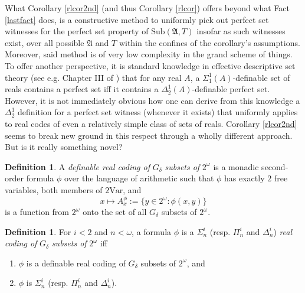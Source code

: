 \documentclass[12pt, twoside]{memoir}
\numberwithin{equation}{section}
\theoremstyle{definition}
\newtheorem{defi}[thm]{Definition}
\theoremstyle{remark}
\theoremstyle{definition}
\theoremstyle{definition}
\theoremstyle{definition}
\theoremstyle{remark}
\begin{document}
What Corollary \ref{rlcor2nd} (and thus Corollary \ref{rlcor}) offers beyond what Fact \ref{lastfact} does, is a constructive method to uniformly pick out perfect set witnesses for the perfect set property of $\mathrm{Sub}(\mathfrak{A}, T)$ insofar as such witnesses exist, over all possible $\mathfrak{A}$ and $T$ within the confines of the corollary's assumptions. Moreover, said method is of very low complexity in the grand scheme of things. To offer another perspective, it is standard knowledge in effective descriptive set theory (see e.g. Chapter III of \cite{sacks}) that for any real $A$, a $\Sigma^1_1(A)$-definable set of reals contains a perfect set iff it contains a $\Delta^1_2(A)$-definable perfect set. However, it is not immediately obvious how one can derive from this knowledge a $\Delta^1_2$ definition for a perfect set witness (whenever it exists) that uniformly applies to real codes of even a relatively simple class of sets of reals. Corollary \ref{rlcor2nd} seems to break new ground in this respect through a wholly different approach. But is it really something novel?

\begin{defi}
A \emph{definable real coding of} $G_{\delta}$ \emph{subsets of} $2^{\omega}$ is a monadic second-order formula $\phi$ over the language of arithmetic such that $\phi$ has exactly $2$ free variables, both members of $\mathrm{2Var}$, and
\begin{equation*}
    x \mapsto A^{\phi}_x := \{y \in 2^{\omega} : \phi(x, y)\}
\end{equation*}
is a function from $2^{\omega}$ onto the set of all $G_{\delta}$ subsets of $2^{\omega}$.
\end{defi}

\begin{defi}
For $i < 2$ and $n < \omega$, a formula $\phi$ is a $\Sigma^i_n$ (resp. $\Pi^i_n$ and $\Delta^i_n$) \emph{real coding of} $G_{\delta}$ \emph{subsets of} $2^{\omega}$ iff 
\begin{enumerate}[label=(\alph*)]
    \item $\phi$ is a definable real coding of $G_{\delta}$ subsets of $2^{\omega}$, and
    \item $\phi$ is $\Sigma^i_n$ (resp. $\Pi^i_n$ and $\Delta^i_n$).
\end{enumerate}
\end{defi}
\end{document}
